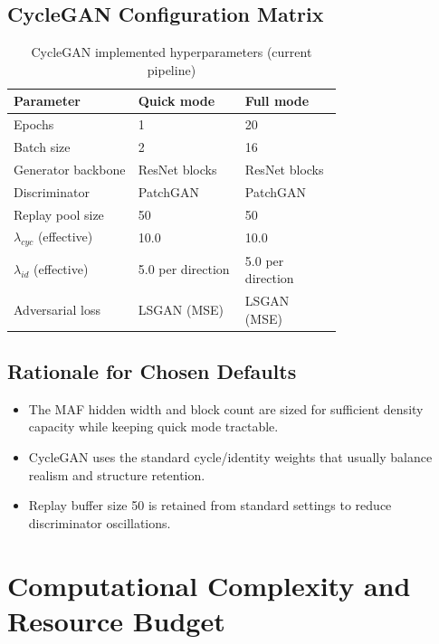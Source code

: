 \documentclass[conference]{IEEEtran}
\begin{document}
\subsection{CycleGAN Configuration Matrix}
\begin{table}[!t]
\centering
\caption{CycleGAN implemented hyperparameters (current pipeline)}
\begin{tabular}{|p{0.28\linewidth}|p{0.24\linewidth}|p{0.20\linewidth}|}
\hline
\textbf{Parameter} & \textbf{Quick mode} & \textbf{Full mode} \\
\hline
Epochs & 1 & 20 \\
\hline
Batch size & 2 & 16 \\
\hline
Generator backbone & ResNet blocks & ResNet blocks \\
\hline
Discriminator & PatchGAN & PatchGAN \\
\hline
Replay pool size & 50 & 50 \\
\hline
$\lambda_{cyc}$ (effective) & 10.0 & 10.0 \\
\hline
$\lambda_{id}$ (effective) & 5.0 per direction & 5.0 per direction \\
\hline
Adversarial loss & LSGAN (MSE) & LSGAN (MSE) \\
\hline
\end{tabular}
\end{table}

\subsection{Rationale for Chosen Defaults}
\begin{itemize}
\item The MAF hidden width and block count are sized for sufficient density capacity while keeping quick mode tractable.
\item CycleGAN uses the standard cycle/identity weights that usually balance realism and structure retention.
\item Replay buffer size 50 is retained from standard settings to reduce discriminator oscillations.
\end{itemize}

\section{Computational Complexity and Resource Budget}
\end{document}
